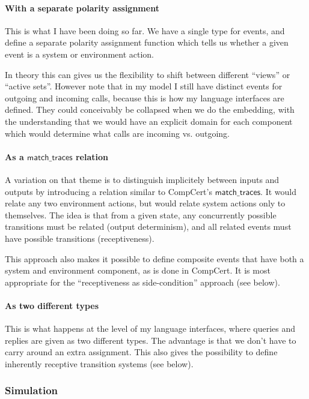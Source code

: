 \documentclass[11pt]{article}
\begin{document}
\paragraph{With a separate polarity assignment}

This is what I have been doing so far.
We have a single type for events,
and define a separate polarity assignment function
which tells us whether a given event
is a system or environment action.

In theory this can gives us the flexibility to shift between
different ``views'' or ``active sets''.
However note that in my model I still have distinct events
for outgoing and incoming calls,
because this is how my language interfaces are defined.
They could conceivably be collapsed
when we do the embedding,
with the understanding that we would have an explicit domain
for each component
which would determine what calls are incoming vs. outgoing.

\paragraph{As a $\mathsf{match\_traces}$ relation}

A variation on that theme is to
distinguish implicitely between inputs and outputs
by introducing a relation similar to CompCert's
$\mathsf{match\_traces}$.
It would relate any two environment actions,
but would relate system actions only to themselves.
The idea is that from a given state,
any concurrently possible transitions must be related
(output determinism),
and all related events must have possible transitions
(receptiveness).

This approach also makes it possible to define
composite events that have both a system and environment component,
as is done in CompCert.
It is most appropriate for the
``receptiveness as side-condition''
approach (see below).

\paragraph{As two different types}

This is what happens at the level of my language interfaces,
where queries and replies are given
as two different types.
The advantage is that we don't have to carry around
an extra assignment.
This also gives the possibility to define
inherently receptive transition systems (see below).


\subsubsection{Simulation} %
\end{document}
